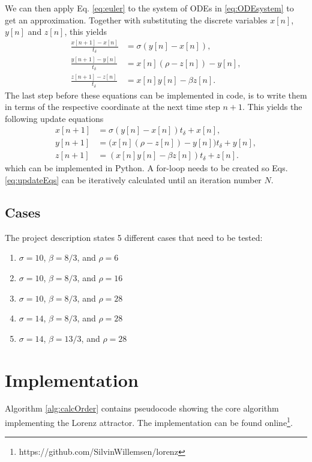 \documentclass{article}
\def\td{t_\delta}
\begin{document}
We can then apply Eq. \eqref{eq:euler} to the system of ODEs in \eqref{eq:ODEsystem} to get an approximation. Together with substituting the discrete variables $x[n]$, $y[n]$ and $z[n]$, this yields
\begin{subequations}
\begin{align}
    \frac{x[n+1] - x[n]}{\td} &= \sigma(y[n]-x[n]),\\
        \frac{y[n+1] - y[n]}{\td} &= x[n](\rho - z[n]) - y[n],\\
        \frac{z[n+1] - z[n]}{\td} &= x[n]y[n] - \beta z[n].
\end{align}
\end{subequations}
The last step before these equations can be implemented in code, is to write them in terms of the respective coordinate at the next time step $n+1$. This yields the following update equations
\begin{subequations}\label{eq:updateEqs}
    \begin{align}
        x[n+1] &= \sigma(y[n]-x[n])\td + x[n],\\
        y[n+1]&= \Big( x[n](\rho - z[n]) - y[n]\Big) \td + y[n],\\
        z[n+1] &= (x[n]y[n] - \beta z[n])\td + z[n].
    \end{align}
\end{subequations}
which can be implemented in Python. A for-loop needs to be created so Eqs. \eqref{eq:updateEqs} can be iteratively calculated until an iteration number $N$.

\subsection{Cases}\label{sec:cases}
The project description states 5 different cases that need to be tested:

\begin{enumerate}
    \item $\sigma = 10$, $\beta = 8/3$, and $\rho = 6$
    \item $\sigma = 10$, $\beta = 8/3$, and $\rho = 16$
    \item $\sigma = 10$, $\beta = 8/3$, and $\rho = 28$
    \item $\sigma = 14$, $\beta = 8/3$, and $\rho = 28$
    \item $\sigma = 14$, $\beta = 13/3$, and $\rho = 28$
\end{enumerate}

\section{Implementation}
Algorithm \ref{alg:calcOrder} contains pseudocode showing the core algorithm implementing the Lorenz attractor. The implementation can be found online\footnote{https://github.com/SilvinWillemsen/lorenz}.
\end{document}
